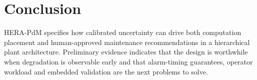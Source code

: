 \documentclass[conference]{IEEEtran}
\begin{document}
\section{Conclusion}
HERA-PdM specifies how calibrated uncertainty can drive both computation placement and human-approved maintenance recommendations in a hierarchical plant architecture. Preliminary evidence indicates that the design is worthwhile when degradation is observable early and that alarm-timing guarantees, operator workload and embedded validation are the next problems to solve.



\end{document}
